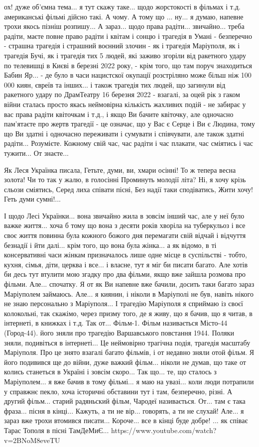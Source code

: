 ох! дуже об'ємна тема... я тут скажу таке... щодо жорстокості в фільмах і т.д.
американські фільмі дійсно такі. А чому. А тому що ... ну... я думаю, напевне
трохи якось пізніш розпишу... А зараз... щодо права радіти... звичайно... треба
радіти, маєте повне право радіти і квітам і сонцю і трагедія в Умані -
безперечно - страшна трагедія і страшний воєнний злочин - як і трагедія
Маріуполя, як і трагедія Бучі, як і трагедія тих 5 людей, які заживо згоріли
від ракетного удару по телевишці в Києві в березні 2022 року, - крім того, що
там поруч знаходиться Бабин Яр... - де було в часи нацистскої окупації
розстріляно може більш ніж 100 000 киян, євреїв та інших... і також трагедія
тих людей, що загинули від ракетного удару по ДрамТеатру 16 березня 2022 -
взагалі, за оцей рік з гаком війни сталась просто якась неймовірна кількість
жахливих подій - не забирає у вас права радіти квіточкам і т.д., і якщо Ви
бачите квіточку, але одночасно пам'ятаєте про жертв трагедії - це означає, що у
Вас є Серце і Ви є Людина, тому що Ви здатні і одночасно переживати і сумувати
і співчувати, але також здатні радіти... Розумієте. Кожному свій час, час
радіти і час плакати, час сміятись і час тужити... От знаєте... 

Як Леся Українка писала, Гетьте, думи, ви, хмари осінні!
То ж тепера весна золота!
Чи то так у жалю, в голосінні
Проминуть молодії літа?
Ні, я хочу крізь сльози сміятись,
Серед лиха співати пісні,
Без надії таки сподіватись,
Жити хочу! Геть думи сумні!... 

І щодо Лесі Українки... вона звичайно жила в зовсім інший час, але у неї було
важке життя... хоча б тому що вона з десяти років хворіла на туберкульоз і все
своє життя повинна була кожного божого дня перемагати свій відчай і відчуття
безнадії і йти далі... крім того, що вона була жінка... а як відомо, в ті
консервативні часи жінкам призначалось лише одне місце в суспільстві - тобто,
кухня, сімья, діти, церква і все... і власне, тут я міг би писати багато. Але
хотів би десь тут втулити мою згадку про два фільми, якщо вже зайшла розмова
про фільми. Але... спочатку. Я от як Ви напевне вже бачили, досить таки багато
зараз Маріуполем займаюсь. Але... я киянин, і ніколи в Маріуполі не був, навіть
нікого не знаю персонально з Маріуполя... І трагедію Маріуполя я сприймаю із
своєї колокольні, так скажімо, через призму того, де я живу, що я бачив, що я
читав, в інтернеті, в книжках і т.д. Так от... Фільм-1. Фільм називається
Місто-44 (Город-44). його зняли про трагедію Варшавського повстання 1944.
Поляки зняли, подивіться в інтернеті... Це неймовірно трагічна подія, трагедія
масштабу Маріуполя. Про це знято взагалі багато фільмів, і от недавно зняли
отой фільм. Я його подивився ще до війни, дуже важкий фільм... ніколи не думав,
що таке от колись станеться в Україні і зовсім скоро... Так що... те, що
сталось з Маріуполем... я вже бачив в тому фільмі... я маю на увазі... коли
люди потрапили у справжнє пекло, хоча історичні обставини тут і там,
безперечно, різні. А другий фільм... старий радяньский фільм, Чародеї
називається. От... там є така фраза... пісня в кінці... Кажуть, а ти не вір...
говорять, а ти не слухай! Але... я зараз вже трохи втомився писати... Короче...
все в кінці буде добре! ... як співає Тарас Тополя в пісні ТамДеМиЄ...
https://www.youtube.com/watch?v=2BNoM8eveTU

